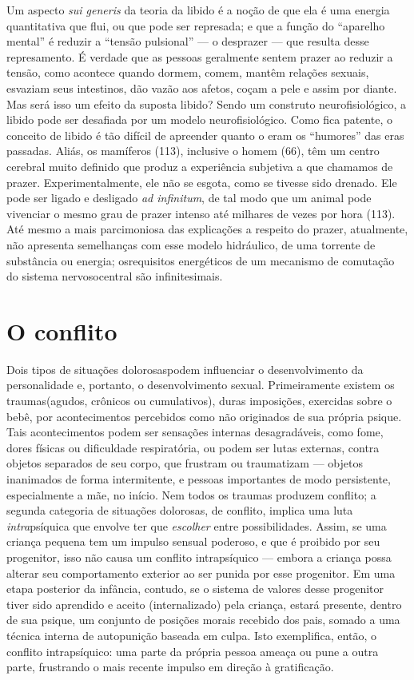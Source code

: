  Um aspecto \textit{sui generis} da teoria da libido é a noção de que
ela é uma energia quantitativa que flui, ou que pode ser represada; e
que a função do ``aparelho mental'' é reduzir
a ``tensão pulsional'' --- o desprazer --- que
resulta desse represamento. É verdade que as pessoas geralmente sentem
prazer ao reduzir a tensão, como acontece quando dormem, comem, mantêm
relações sexuais, esvaziam seus intestinos, dão vazão aos afetos, coçam
a pele e assim por diante. Mas será isso um efeito da suposta libido?
Sendo um construto neurofisiológico, a libido pode ser desafiada por um
modelo neurofisiológico. Como fica patente, o conceito de libido é tão
difícil de apreender quanto o eram os ``humores'' das eras passadas. Aliás, os
mamíferos (113), inclusive o homem (66), têm um centro cerebral muito
definido que produz a experiência subjetiva a que chamamos de prazer.\idxcerebpraz{} Experimentalmente, ele não se esgota, como se tivesse sido drenado. Ele
pode ser ligado e desligado \textit{ad infinitum}, de tal modo que um
animal pode vivenciar o mesmo grau de prazer intenso até milhares de
vezes por hora (113). Até mesmo a mais parcimoniosa das explicações a
respeito do prazer, atualmente, não apresenta semelhanças com esse
modelo hidráulico, de uma torrente de substância ou energia; os\idxlibid[|)]
requisitos energéticos de um mecanismo de comutação do sistema nervoso\idxsociadese[|)]
central são infinitesimais.

\section{O conflito}

 Dois tipos de situações dolorosas\idxconf[|(] podem influenciar o
desenvolvimento da personalidade e, portanto, o desenvolvimento sexual.
Primeiramente existem os traumas\idxtrauma[|(] (agudos, crônicos ou cumulativos),
duras imposições, exercidas sobre o bebê, por acontecimentos percebidos
como não originados de sua própria psique. Tais acontecimentos podem
ser sensações internas desagradáveis, como fome, dores físicas ou
dificuldade respiratória, ou podem ser lutas externas, contra objetos
separados de seu corpo, que frustram ou traumatizam --- objetos
inanimados de forma intermitente, e pessoas importantes de modo
persistente, especialmente a mãe, no início. Nem todos os traumas
produzem conflito; a segunda categoria de situações dolorosas, de
conflito, implica uma luta \textit{intra}psíquica que envolve ter que
\textit{escolher} entre possibilidades. Assim, se uma criança pequena
tem um impulso sensual poderoso, e que é proibido por seu progenitor,
isso não causa um conflito intrapsíquico\idxconfintr{} --- embora a criança possa
alterar seu comportamento exterior ao ser punida por esse progenitor.
Em uma etapa posterior da infância, contudo, se o sistema de valores
desse progenitor tiver sido aprendido e aceito (internalizado) pela
criança, estará presente, dentro de sua psique, um conjunto de
posições morais recebido dos pais, somado a uma técnica interna de
autopunição baseada em culpa.\idxculpa{} Isto exemplifica, então, o conflito
intrapsíquico: uma parte da própria pessoa ameaça ou pune a outra
parte, frustrando o mais recente impulso em direção à gratificação.

